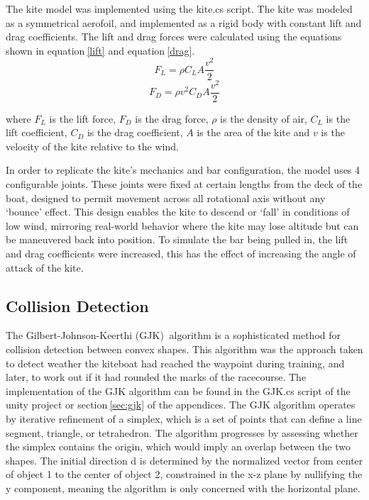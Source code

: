 The kite model was implemented using the kite.cs script. The kite was modeled as a symmetrical aerofoil, and implemented as a rigid body with constant lift and drag coefficients. The lift and drag forces were calculated using the equations shown in equation$~$\ref{lift} and equation$~$\ref{drag}.
\begin{equation}
    F_L = \rho C_L A \frac{v^2}{2} 
    \label{lift}
\end{equation}
\begin{equation}
    F_D = \rho v^2 C_D A \frac{v^2}{2} 
    \label{drag}
\end{equation}

where $F_L$ is the lift force, $F_D$ is the drag force, $\rho$ is the density of air, $C_L$ is the lift coefficient, $C_D$ is the drag coefficient, $A$ is the area of the kite and $v$ is the velocity of the kite relative to the wind.

In order to replicate the kite's mechanics and bar configuration, the model uses 4 configurable joints. These joints were fixed at certain lengths from the deck of the boat, designed to permit movement across all rotational axis without any `bounce' effect. This design enables the kite to descend or `fall' in conditions of low wind, mirroring real-world behavior where the kite may lose altitude but can be maneuvered back into position. To simulate the bar being pulled in, the lift and drag coefficients were increased, this has the effect of increasing the angle of attack of the kite.


\subsection{Collision Detection}
The Gilbert-Johnson-Keerthi (GJK)$~$\cite{gilbert88gjk} algorithm is a sophisticated method for collision detection between convex shapes. This algorithm was the approach taken to detect weather the kiteboat had reached the waypoint during training, and later, to work out if it had rounded the marks of the racecourse. The implementation of the GJK algorithm can be found in the GJK.cs script of the unity project or section$~$\ref{sec:gjk} of the appendices.
The GJK algorithm operates by iterative refinement of a simplex, which is a set of points that can define a line segment, triangle, or tetrahedron. The algorithm progresses by assessing whether the simplex contains the origin, which would imply an overlap between the two shapes. The initial direction d is determined by the normalized vector from center of object 1 to the center of object 2, constrained in the x-z plane by nullifying the y component, meaning the algorithm is only concerned with the horizontal plane.  

